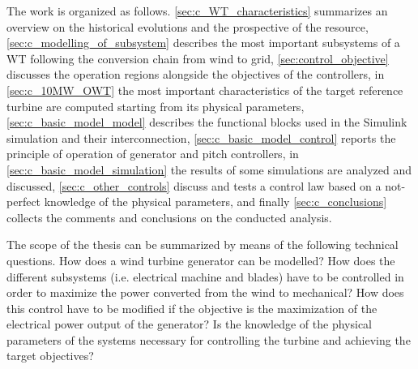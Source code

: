 The work is organized as follows. \autoref{sec:c_WT_characteristics} summarizes an overview on the historical evolutions and the prospective of the resource, \autoref{sec:c_modelling_of_subsystem} describes the most important subsystems of a WT following the conversion chain from wind to grid, \autoref{sec:control_objective} discusses the operation regions alongside the objectives of the controllers, in \autoref{sec:c_10MW_OWT} the most important characteristics of the target reference turbine are computed starting from its physical parameters, \autoref{sec:c_basic_model_model} describes the functional blocks used in the Simulink simulation and their interconnection, \autoref{sec:c_basic_model_control} reports the principle of operation of generator and pitch controllers, in \autoref{sec:c_basic_model_simulation} the results of some simulations are analyzed and discussed, \autoref{sec:c_other_controls} discuss and tests a control law based on a not-perfect knowledge of the physical parameters, and finally \autoref{sec:c_conclusions} collects the comments and conclusions on the conducted analysis.

The scope of the thesis can be summarized by means of the following technical questions. How does a wind turbine generator can be modelled? How does the different subsystems (i.e. electrical machine and blades) have to be controlled in order to maximize the power converted from the wind to mechanical? How does this control have to be modified if the objective is the maximization of the electrical power output of the generator? Is the knowledge of the physical parameters of the systems necessary for controlling the turbine and achieving the target objectives? 

